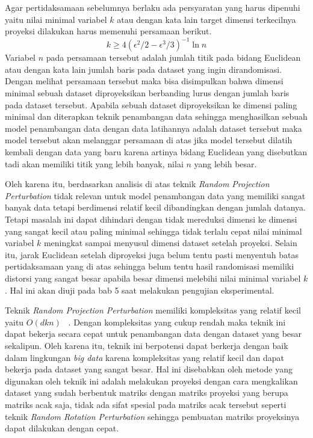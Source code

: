 Agar pertidaksamaan sebelumnya berlaku ada persyaratan yang harus dipenuhi yaitu nilai minimal variabel \(k\) atau dengan kata lain target dimensi terkecilnya proyeksi dilakukan harus memenuhi persamaan berikut.
\begin{equation}
	k \geq 4(\epsilon^{2}/2-\epsilon^{3}/3)^{-1}\ln{n}
\end{equation}
Variabel \(n\) pada persamaan tersebut adalah jumlah titik pada bidang Euclidean atau dengan kata lain jumlah baris pada dataset yang ingin dirandomisasi. Dengan melihat persamaan tersebut maka bisa disimpulkan bahwa dimensi minimal sebuah dataset diproyeksikan berbanding lurus dengan jumlah baris pada dataset tersebut. Apabila sebuah dataset diproyeksikan ke dimensi paling minimal dan diterapkan teknik penambangan data sehingga menghasilkan sebuah model penambangan data dengan data latihannya adalah dataset tersebut maka model tersebut akan melanggar persamaan di atas jika model tersebut dilatih kembali dengan data yang baru karena artinya bidang Euclidean yang disebutkan tadi akan memiliki titik yang lebih banyak, nilai \(n\) yang lebih besar. 

Oleh karena itu, berdasarkan analisis di atas teknik \textit{Random Projection Perturbation} tidak relevan untuk model penambangan data yang memiliki sangat banyak data tetapi berdimensi relatif kecil dibandingkan dengan jumlah datanya. Tetapi masalah ini dapat dihindari dengan tidak mereduksi dimensi ke dimensi yang sangat kecil atau paling minimal sehingga tidak terlalu cepat nilai minimal variabel \(k\) meningkat sampai menyusul dimensi dataset setelah proyeksi. Selain itu, jarak Euclidean setelah diproyeksi juga belum tentu pasti menyentuh batas pertidaksamaan yang di atas sehingga belum tentu hasil randomisasi memiliki distorsi yang sangat besar apabila besar dimensi melebihi nilai minimal variabel \(k\). Hal ini akan diuji pada bab 5 saat melakukan pengujian eksperimental.

Teknik \textit{Random Projection Perturbation} memiliki kompleksitas yang relatif kecil yaitu \(O(dkn)\) ~\cite{bingham:01:projection}. Dengan kompleksitas yang cukup rendah maka teknik ini dapat bekerja secara cepat untuk penambangan data dengan dataset yang besar sekalipun. Oleh karena itu, teknik ini berpotensi dapat berkerja dengan baik dalam lingkungan \textit{big data} karena kompleksitas yang relatif kecil dan dapat bekerja pada dataset yang sangat besar. Hal ini disebabkan oleh metode yang digunakan oleh teknik ini adalah melakukan proyeksi dengan cara mengkalikan dataset yang sudah berbentuk matriks dengan matriks proyeksi yang berupa matriks acak saja, tidak ada sifat spesial pada matriks acak tersebut seperti teknik \textit{Random Rotation Perturbation} sehingga pembuatan matriks proyeksinya dapat dilakukan dengan cepat.

